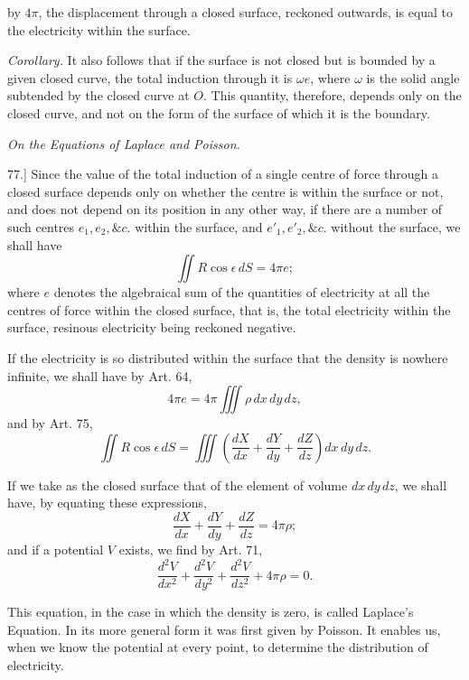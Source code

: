 \documentclass[11pt,a4paper]{article}
\begin{document}
\clearpage
\setcounter{footnote}{0}

by \(4\pi\), the displacement through a closed surface, reckoned outwards,
is equal to the electricity within the surface.

\textit{Corollary.} It also follows that if the surface is not closed
but is bounded by a given closed curve, the total induction through it
is \(\omega e\), where \(\omega\) is the solid angle subtended by the
closed curve at \(O\). This quantity, therefore, depends only on the
closed curve, and not on the form of the surface of which it is the
boundary.

\begin{center}
\textit{On the Equations of Laplace and Poisson.}
\end{center}

77.] Since the value of the total induction of a single centre of force
through a closed surface depends only on whether the centre is within
the surface or not, and does not depend on its position in any other
way, if there are a number of such centres \(e_1,e_2,\&c.\) within the
surface, and \(e'_1,e'_2,\&c.\) without the surface, we shall have
\[
\iint R\cos\epsilon\,dS=4\pi e;
\]
where \(e\) denotes the algebraical sum of the quantities of electricity
at all the centres of force within the closed surface, that is, the
total electricity within the surface, resinous electricity being reckoned
negative.

If the electricity is so distributed within the surface that the density
is nowhere infinite, we shall have by Art. 64,
\[
4\pi e=4\pi\iiint \rho\,dx\,dy\,dz,
\]
and by Art. 75,
\[
\iint R\cos\epsilon\,dS
=
\iiint\left(\frac{dX}{dx}+\frac{dY}{dy}+\frac{dZ}{dz}\right)dx\,dy\,dz.
\]

If we take as the closed surface that of the element of volume
\(dx\,dy\,dz\), we shall have, by equating these expressions,
\[
\frac{dX}{dx}+\frac{dY}{dy}+\frac{dZ}{dz}=4\pi\rho;
\]
and if a potential \(V\) exists, we find by Art. 71,
\[
\frac{d^2V}{dx^2}+\frac{d^2V}{dy^2}+\frac{d^2V}{dz^2}+4\pi\rho=0.
\]

This equation, in the case in which the density is zero, is called
Laplace's Equation. In its more general form it was first given by
Poisson. It enables us, when we know the potential at every point, to
determine the distribution of electricity.
\end{document}
